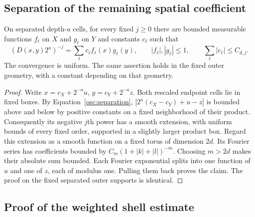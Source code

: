 \subsection{Separation of the remaining spatial coefficient}

\begin{lemma}\label{osc:spatial-separation}
On separated depth-$a$ cells, for every fixed $j\ge0$ there are bounded
measurable functions $f_\ell$ on $X$ and $g_\ell$ on $Y$ and constants
$c_\ell$ such that
\begin{equation}\label{osc:spatial-series}
 (D(x,y)2^a)^{-j}
   =\sum_\ell c_\ell f_\ell(x)g_\ell(y),\qquad
 |f_\ell|,|g_\ell|\le1,\qquad
 \sum_\ell|c_\ell|\le C_{d,j}.
\end{equation}
The convergence is uniform.  The same assertion holds in the fixed
outer geometry, with a constant depending on that geometry.
\end{lemma}

\begin{proof}
Write $x=c_X+2^{-a}u$, $y=c_Y+2^{-a}z$.  Both rescaled endpoint cells
lie in fixed boxes.  By Equation~\eqref{osc:separation},
$|2^a(c_X-c_Y)+u-z|$ is bounded above and below by positive constants on
a fixed neighborhood of their product.  Consequently its negative
$j$th power has a smooth extension, with uniform bounds of every fixed
order, supported in a slightly larger product box.  Regard this
extension as a smooth function on a fixed torus of dimension $2d$.
Its Fourier series has coefficients bounded by
$C_m(1+|k|+|l|)^{-m}$.  Choosing $m>2d$ makes their absolute sum bounded.
Each Fourier exponential splits into one function of $u$ and one of
$z$, each of modulus one.  Pulling them back proves the claim.
The proof on the fixed separated outer supports is identical.
\end{proof}

\subsection{Proof of the weighted shell estimate}

